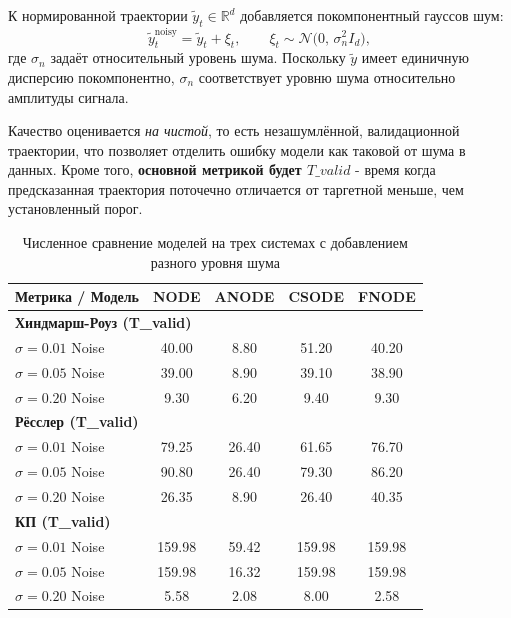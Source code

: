 \documentclass[PMI,VKR]{HSEUniversity}
\begin{document}
К нормированной траектории $\tilde y_t \in \mathbb{R}^d$ добавляется
покомпонентный гауссов шум:
\[
    \tilde y_t^{\text{noisy}} = \tilde y_t + \xi_t,
    \qquad \xi_t \sim \mathcal{N}\bigl(0,\,\sigma_n^{2} I_d\bigr),
\]
где $\sigma_n$ задаёт относительный уровень шума. Поскольку
$\tilde y$ имеет единичную дисперсию покомпонентно, $\sigma_n$
соответствует уровню шума относительно амплитуды сигнала.

\vspace{1em}

Качество оценивается \emph{на чистой}, то есть незашумлённой,
валидационной траектории, что позволяет отделить ошибку модели как
таковой от шума в данных. Кроме того, \textbf{основной метрикой будет $T\_valid$} - время когда предсказанная траектория поточечно отличается от таргетной меньше, чем установленный порог.

\begin{table}[H]
\centering
    \begin{tabular}{l|cccc}
    \toprule
    \textbf{Метрика / Модель} &
    \textbf{NODE} &
    \textbf{ANODE} &
    \textbf{CSODE} &
    \textbf{FNODE} \\
    \midrule

    \multicolumn{5}{l}{\textbf{Хиндмарш-Роуз (T\_valid)}} \\
    $\sigma=0.01$ Noise & 40.00 & 8.80 & 51.20 & 40.20 \\
    $\sigma=0.05$ Noise & 39.00 & 8.90 & 39.10 & 38.90 \\
    $\sigma=0.20$ Noise & 9.30 & 6.20 & 9.40 & 9.30 \\

    \midrule

    \multicolumn{5}{l}{\textbf{Рёсслер (T\_valid)}} \\
    $\sigma=0.01$ Noise & 79.25 & 26.40 & 61.65 & 76.70 \\
    $\sigma=0.05$ Noise & 90.80 & 26.40 & 79.30 & 86.20 \\
    $\sigma=0.20$ Noise & 26.35 & 8.90 & 26.40 & 40.35 \\

    \midrule

    \multicolumn{5}{l}{\textbf{КП (T\_valid)}} \\
    $\sigma=0.01$ Noise & 159.98 & 59.42 & 159.98 & 159.98 \\
    $\sigma=0.05$ Noise & 159.98 & 16.32 & 159.98 & 159.98 \\
    $\sigma=0.20$ Noise & 5.58 & 2.08 & 8.00 & 2.58 \\

    \bottomrule
    \end{tabular}
\caption{Численное сравнение моделей на трех системах с добавлением разного уровня шума}
\end{table}
\end{document}
